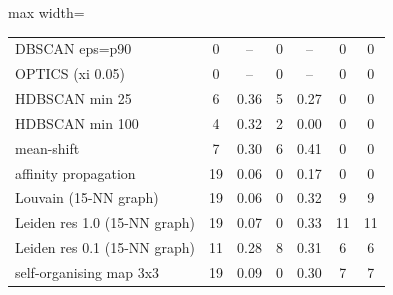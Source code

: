 \begin{table}[htbp]
\begin{adjustbox}{max width=\linewidth}
\begin{tabular}{lcccccc}
DBSCAN eps=p90 & 0 & -- & 0 & -- & 0 & 0 \\
OPTICS (xi 0.05) & 0 & -- & 0 & -- & 0 & 0 \\
HDBSCAN min 25 & 6 & 0.36 & 5 & 0.27 & 0 & 0 \\
HDBSCAN min 100 & 4 & 0.32 & 2 & 0.00 & 0 & 0 \\
mean-shift & 7 & 0.30 & 6 & 0.41 & 0 & 0 \\
affinity propagation & 19 & 0.06 & 0 & 0.17 & 0 & 0 \\
Louvain (15-NN graph) & 19 & 0.06 & 0 & 0.32 & 9 & 9 \\
Leiden res 1.0 (15-NN graph) & 19 & 0.07 & 0 & 0.33 & 11 & 11 \\
Leiden res 0.1 (15-NN graph) & 11 & 0.28 & 8 & 0.31 & 6 & 6 \\
self-organising map 3x3 & 19 & 0.09 & 0 & 0.30 & 7 & 7 \\
\bottomrule
\end{tabular}
\end{adjustbox}
\end{table}
